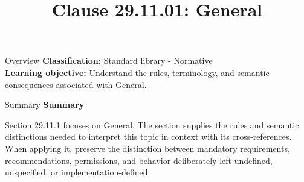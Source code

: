 \documentclass[10pt,letterpaper]{article}
\title{Clause 29.11.01: General}
\author{}
\date{}
\begin{document}
\maketitle
\begin{CornellOverviewBox}{Overview}
\textbf{Classification:} Standard library - Normative\\[2pt]
\textbf{Learning objective:} Understand the rules, terminology, and semantic consequences associated with General.
\end{CornellOverviewBox}\begin{CornellSummaryBox}{Summary}
{\sffamily\bfseries\color{Accent} Summary}\par\vspace{3pt}Section 29.11.1 focuses on General. The section supplies the rules and semantic distinctions needed to interpret this topic in context with its cross-references. When applying it, preserve the distinction between mandatory requirements, recommendations, permissions, and behavior deliberately left undefined, unspecified, or implementation-defined.
\end{CornellSummaryBox}
\end{document}
